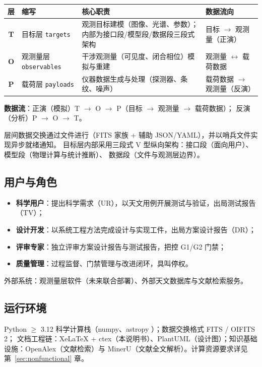 \begin{center}
\begin{tabular}{clp{7.2cm}l}
\toprule
层 & 缩写 & 核心职责 & 数据流向 \\
\midrule
\textbf{T} & 目标层 \texttt{targets} & 观测目标建模（图像、光谱、参数）；内部为接口段/模型段/数据段三段式架构 &
目标 $\rightarrow$ 观测量（正演） \\
\textbf{O} & 观测量层 \texttt{observables} & 干涉观测量（可见度、闭合相位）模拟与重建 &
观测量 $\leftrightarrow$ 载荷数据 \\
\textbf{P} & 载荷层 \texttt{payloads} & 仪器数据生成与处理（探测器、条纹、噪声） &
载荷数据 $\rightarrow$ 观测量（反演） \\
\bottomrule
\end{tabular}
\end{center}

\textbf{数据流}：正演（模拟）T $\rightarrow$ O $\rightarrow$ P（目标 $\rightarrow$ 观测量 $\rightarrow$ 载荷数据）；
反演（分析）P $\rightarrow$ O $\rightarrow$ T。

层间数据交换通过文件进行（FITS 家族 + 辅助 JSON/YAML），并以哨兵文件实现异步就绪通知。
目标层内部采用三段式 V 型纵向架构：接口段（面向用户）、模型段（物理计算与统计推断）、
数据段（文件与观测层边界）。

\subsection{用户与角色}

\begin{itemize}
  \item \textbf{科学用户}：提出科学需求（UR），以天文用例开展测试与验证，出局测试报告（TV）；
  \item \textbf{设计开发}：以系统工程方法完成设计与实现工件，出局方案设计报告（DR）；
  \item \textbf{评审专家}：独立评审方案设计报告与测试报告，把控 G1/G2 门禁；
  \item \textbf{质量管理}：过程监督、门禁管理与改进闭环，具叫停权。
\end{itemize}

外部系统：观测量层软件（未来联合部署）、外部天文数据库与文献检索服务。

\subsection{运行环境}

Python $\geq$ 3.12 科学计算栈（numpy、astropy \cite{astropy2022}）；数据交换格式 FITS / OIFITS 2；
文档工程链：XeLaTeX + ctex（本说明书）、PlantUML（设计图）；知识基础设施：OpenAlex（文献检索）与
MinerU（文献全文解析）。计算资源要求详见第~\ref{sec:nonfunctional} 章。
